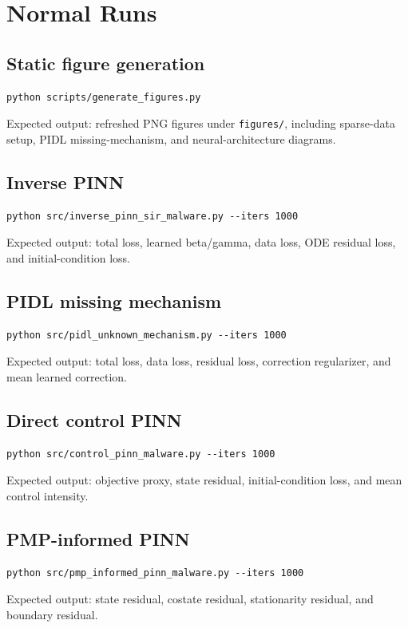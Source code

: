 \documentclass[11pt,a4paper]{article}
\begin{document}
\section{Normal Runs}
\subsection{Static figure generation}
\begin{lstlisting}[style=pythonstyle]
python scripts/generate_figures.py
\end{lstlisting}
Expected output: refreshed PNG figures under \texttt{figures/}, including sparse-data setup, PIDL missing-mechanism, and neural-architecture diagrams.

\subsection{Inverse PINN}
\begin{lstlisting}[style=pythonstyle]
python src/inverse_pinn_sir_malware.py --iters 1000
\end{lstlisting}
Expected output: total loss, learned beta/gamma, data loss, ODE residual loss, and initial-condition loss.

\subsection{PIDL missing mechanism}
\begin{lstlisting}[style=pythonstyle]
python src/pidl_unknown_mechanism.py --iters 1000
\end{lstlisting}
Expected output: total loss, data loss, residual loss, correction regularizer, and mean learned correction.

\subsection{Direct control PINN}
\begin{lstlisting}[style=pythonstyle]
python src/control_pinn_malware.py --iters 1000
\end{lstlisting}
Expected output: objective proxy, state residual, initial-condition loss, and mean control intensity.

\subsection{PMP-informed PINN}
\begin{lstlisting}[style=pythonstyle]
python src/pmp_informed_pinn_malware.py --iters 1000
\end{lstlisting}
Expected output: state residual, costate residual, stationarity residual, and boundary residual.
\end{document}
